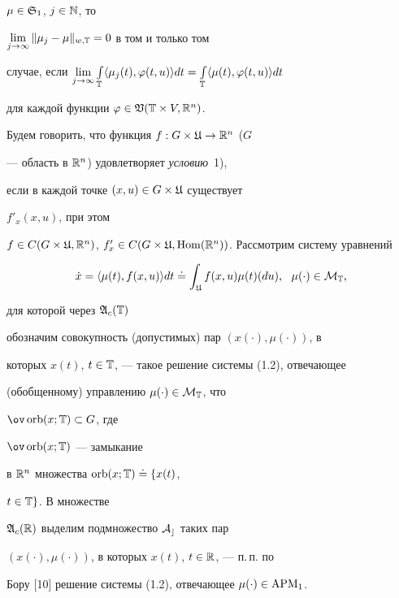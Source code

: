 $\mu\in\frak S_1$, $j\in\Bbb N$, то


$\lim\limits_{j\to\infty}\|\mu_j-\mu\|_{w,\Bbb T}=0$ в том и только том


случае, если $\lim\limits_{j\to\infty}


\int\limits_{\bT}\langle\mu_j(t),\varphi(t,u)\rangle dt=


\int\limits_{\bT}\langle \mu(t),\varphi (t,u)\rangle dt$


для каждой функции $\varphi\in\frak V(\Bbb T \times V,\Bbb R^n)$.





Будем говорить, что функция $f: G\times\frak U\to\Bbb R^n$ ($G$


--- область в $\Bbb R^n$) удовлетворяет {\it условию}~1),


если в каждой точке $(x,u)\in G\times\frak U$ существует


$f'_{x}(x,u)$, при этом


$f\in C(G\times\frak U,\bR^n)$, $f'_{x}\in C(G\times\frak U,


\Hom(\bR^n))$. Рассмотрим систему уравнений


\begin{equation}


\Dot x=\langle \mu(t),f(x,u)\rangle dt\doteq


\int_{\frak U}f(x,u)\mu(t)(du),\ \


\mu(\cdot)\in\cal M_{\bT},


\end{equation}


для которой через $\frak A_c(\Bbb T)$


обозначим совокупность (допустимых) пар $(x(\cdot),\mu(\cdot))$, в


которых $x(t)$, $t\in\Bbb T$, --- такое решение системы (1.2), отвечающее


(обобщенному) управлению $\mu(\cdot)\in\cal M_{\Bbb T}$, что 


$\ov\orb(x;\bT)\subset G$, где 


$\ov\orb(x;\bT)$ --- замыкание


в $\Bbb R^n$ множества $\operatorname{orb}(x;\Bbb T)\doteq\{x(t)$,


$t\in\Bbb T\}$. В множестве


$\frak A_c(\Bbb R)$ выделим подмножество $\cal A_c$ таких пар


$(x(\cdot),\mu(\cdot))$, в которых $x(t)$, $t\in\Bbb R$, --- п.\,п. по


Бору [10] решение системы (1.2), отвечающее $\mu(\cdot)\in\operatorname{APM}_1$.





